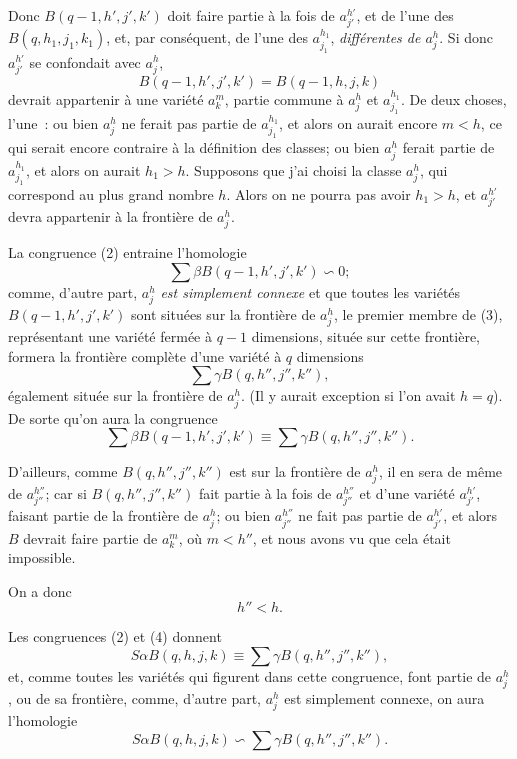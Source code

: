 \documentclass{article}
\begin{document}

Donc $B(q - 1, h', j', k')$ doit faire partie à la fois de $a^{h'}_{j'}$, et de l'une des $B(q, h_{1}, j_{1}, k_{1})$, et, par conséquent, de l'une des $a^{h_{1}}_{j_{1}}$, \emph{différentes de $a^{h}_{j}$}. Si donc $a^{h'}_{j'}$ se confondait avec $a^{h}_{j}$,
\[ B(q - 1, h', j', k') = B(q - 1, h, j, k) \]
devrait appartenir à une variété $a^{m}_{k}$, partie commune à $a^{h}_{j}$ et $a^{h_{1}}_{j_{1}}$. De deux choses, l'une~: ou bien $a^{h}_{j}$ ne ferait pas partie de $a^{h_{1}}_{j_{1}}$, et alors on aurait encore $m < h$, ce qui serait encore contraire à la définition des classes; ou bien $a^{h}_{j}$ ferait partie de $a^{h_{1}}_{j_{1}}$, et alors on aurait $h_{1} > h$. Supposons que j'ai choisi la classe $a^{h}_{j}$, qui correspond au plus grand nombre $h$. Alors on ne pourra pas avoir $h_{1} > h$, et $a^{h'}_{j'}$ devra appartenir à la frontière de $a^{h}_{j}$.

La congruence (2) entraine l'homologie
\[ \sum \beta B(q - 1, h', j', k') \backsim 0; \tag{3} \]
comme, d'autre part, $a^{h}_{j}$ \emph{est simplement connexe} et que toutes les variétés $B(q - 1, h', j', k')$ sont situées sur la frontière de $a^{h}_{j}$, le premier membre de (3), représentant une variété fermée à $q - 1$ dimensions, située sur cette frontière, formera la frontière complète d'une variété à $q$ dimensions
\[ \sum \gamma B(q, h'', j'', k''), \]
également située sur la frontière de $a^{h}_{j}$. (Il y aurait exception si l'on avait $h = q$). De sorte qu'on aura la congruence
\[ \sum \beta B(q - 1, h', j', k') \equiv \sum \gamma B(q, h'', j'', k''). \tag{4} \]

D'ailleurs, comme $B(q, h'', j'', k'')$ est sur la frontière de $a^{h}_{j}$, il en sera de même de $a^{h''}_{j''}$; car si $B(q, h'', j'', k'')$ fait partie à la fois de $a^{h''}_{j''}$ et d'une variété $a^{h'}_{j'}$, faisant partie de la frontière de $a^{h}_{j}$; ou bien $a^{h''}_{j''}$ ne fait pas partie de $a^{h'}_{j'}$, et alors $B$ devrait faire partie de $a^{m}_{k}$, où $m < h''$, et nous avons vu que cela était impossible.


On a donc
\[ h'' < h. \]

Les congruences (2) et (4) donnent
\[ S \alpha B(q, h, j, k) \equiv \sum \gamma B(q, h'', j'', k''), \]
et, comme toutes les variétés qui figurent dans cette congruence, font partie de $a^{h}_{j}$, ou de sa frontière, comme, d'autre part, $a^{h}_{j}$ est simplement connexe, on aura l'homologie
\[ S \alpha B(q, h, j, k) \backsim \sum \gamma B(q, h'', j'', k''). \]
\end{document}

